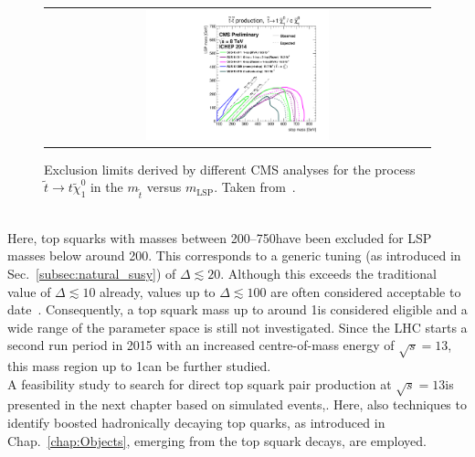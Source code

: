 \begin{figure}[!t]
  \centering
  \begin{tabular}{c}
                \includegraphics[width=0.49\textwidth]{figures/T2tt_ICHEP2014_All.pdf} 
  \end{tabular}
\caption{Exclusion limits derived by different CMS analyses for the process $\tilde{t} \rightarrow t\tilde{\chi}_1^0$ in the $m_{\tilde{t}}$ versus $m_\mathrm{LSP}$. Taken from~\cite{bib:CMS:PhysicsResultsSUS}.} 
  \label{fig:8TeV_stop_limits}
\end{figure}
\\
Here, top squarks with masses between 200--750\gev have been excluded for LSP masses below around 200\gev. This corresponds to a generic tuning (as introduced in Sec.~\ref{subsec:natural_susy}) of $\Delta \lesssim 20$. Although this exceeds the traditional value of $\Delta \lesssim 10$ already, values up to $\Delta \lesssim 100$ are often considered acceptable to date~\cite{Craig:2013cxa}. Consequently, a top squark mass up to around 1\tev is considered eligible and a wide range of the parameter space is still not investigated. Since the LHC starts a second run period in 2015 with an increased centre-of-mass energy of $\sqrt{s} = 13$\tev, this mass region up to 1\tev can be further studied.\\
A feasibility study to search for direct top squark pair production at $\sqrt{s} = 13$\tev is presented in the next chapter based on simulated events,. Here, also techniques to identify boosted hadronically decaying top quarks, as introduced in Chap.~\ref{chap:Objects}, emerging from the top squark decays, are employed.
